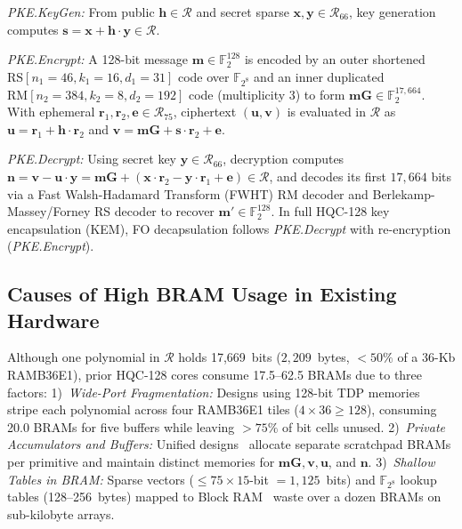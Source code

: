 \documentclass[journal]{IEEEtran}
\begin{document}
\textit{PKE.KeyGen:} From public $\mathbf{h} \in \mathcal{R}$ and secret sparse $\mathbf{x}, \mathbf{y} \in \mathcal{R}_{66}$, key generation computes $\mathbf{s} = \mathbf{x} + \mathbf{h} \cdot \mathbf{y} \in \mathcal{R}$.

\textit{PKE.Encrypt:} A 128-bit message $\mathbf{m} \in \mathbb{F}_2^{128}$ is encoded by an outer shortened $\mathrm{RS}[n_1=46, k_1=16, d_1=31]$ code over $\mathbb{F}_{2^8}$ and an inner duplicated $\mathrm{RM}[n_2=384, k_2=8, d_2=192]$ code (multiplicity 3) to form $\mathbf{mG} \in \mathbb{F}_2^{17,664}$. With ephemeral $\mathbf{r}_1, \mathbf{r}_2, \mathbf{e} \in \mathcal{R}_{75}$, ciphertext $(\mathbf{u}, \mathbf{v})$ is evaluated in $\mathcal{R}$ as $\mathbf{u} = \mathbf{r}_1 + \mathbf{h} \cdot \mathbf{r}_2$ and $\mathbf{v} = \mathbf{mG} + \mathbf{s} \cdot \mathbf{r}_2 + \mathbf{e}$.

\textit{PKE.Decrypt:} Using secret key $\mathbf{y} \in \mathcal{R}_{66}$, decryption computes $\mathbf{n} = \mathbf{v} - \mathbf{u} \cdot \mathbf{y} = \mathbf{mG} + (\mathbf{x} \cdot \mathbf{r}_2 - \mathbf{y} \cdot \mathbf{r}_1 + \mathbf{e}) \in \mathcal{R}$, and decodes its first $17,664$ bits via a Fast Walsh-Hadamard Transform (FWHT) RM decoder and Berlekamp-Massey/Forney RS decoder to recover $\mathbf{m}' \in \mathbb{F}_2^{128}$. In full HQC-128 key encapsulation (KEM), FO decapsulation follows \textit{PKE.Decrypt} with re-encryption (\textit{PKE.Encrypt}).

\subsection{Causes of High BRAM Usage in Existing Hardware}
Although one polynomial in $\mathcal{R}$ holds 17,669~bits ($2,209$~bytes, $<50\%$ of a 36-Kb RAMB36E1), prior HQC-128 cores consume 17.5--62.5 BRAMs due to three factors: 1)~\textit{Wide-Port Fragmentation:} Designs using 128-bit TDP memories~\cite{deshpande2023fast, antognazza2024high} stripe each polynomial across four RAMB36E1 tiles ($4 \times 36 \ge 128$), consuming 20.0 BRAMs for five buffers while leaving $>75\%$ of bit cells unused. 2)~\textit{Private Accumulators and Buffers:} Unified designs~\cite{deshpande2023fast, wang2024high} allocate separate scratchpad BRAMs per primitive and maintain distinct memories for $\mathbf{mG}, \mathbf{v}, \mathbf{u}$, and $\mathbf{n}$. 3)~\textit{Shallow Tables in BRAM:} Sparse vectors ($\le 75 \times 15$-bit $= 1,125$~bits) and $\mathbb{F}_{2^8}$ lookup tables (128--256~bytes) mapped to Block RAM~\cite{deshpande2023fast, wang2024high} waste over a dozen BRAMs on sub-kilobyte arrays.
\end{document}

